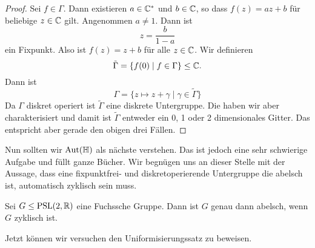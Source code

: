 \begin{proof}
  Sei $f \in \Gamma$. Dann existieren $a \in \mathbb{C}^\ast$ und $b \in
  \mathbb{C}$, so dass $f(z) = az +b$ für beliebige $z \in \mathbb{C}$
  gilt. Angenommen $a \neq 1$. Dann ist
  \[
  z = \frac{b}{1-a}
  \]
  ein Fixpunkt. Also ist $f(z) = z + b$ für alle $z \in \mathbb{C}$. Wir
  definieren
  \[
  \tilde \Gamma = \{f(0) \mid f \in \Gamma\} \leq \mathbb{C}.
  \]
  Dann ist
  \[
  \Gamma = \{z \mapsto z + \gamma \mid \gamma \in \tilde \Gamma \}
  \]
  Da $\Gamma$ diskret operiert ist $\tilde \Gamma$ eine diskrete
  Untergruppe. Die haben wir aber charakterisiert und damit ist
  $\tilde \Gamma$ entweder ein 0, 1 oder 2 dimensionales Gitter. Das
  entspricht aber gerade den obigen drei Fällen.
\end{proof}

Nun sollten wir $\operatorname{Aut}(\mathbb{H})$ als nächste verstehen. Das ist jedoch eine
sehr schwierige Aufgabe und füllt ganze Bücher. Wir begnügen uns an
dieser Stelle mit der Aussage, dass eine fixpunktfrei- und
diskretoperierende Untergruppe die abelsch ist, automatisch zyklisch
sein muss.

\begin{thm}
  \label{thm:abelsch-zyklisch}
  Sei $G \leq \operatorname{PSL}(2, \mathbb{R})$ eine Fuchssche Gruppe. Dann ist $G$ genau
  dann abelsch, wenn $G$ zyklisch ist.
\end{thm}

Jetzt können wir versuchen den Uniformisierungssatz zu beweisen.

